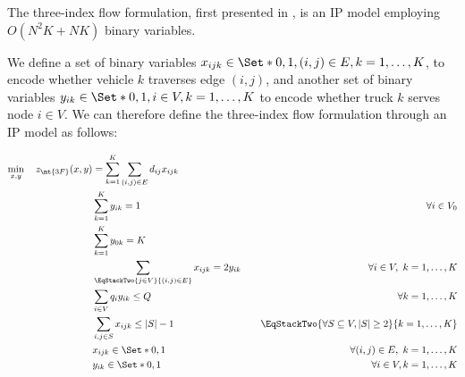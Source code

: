 The three-index flow formulation, first presented in \textcite{toth2002},
is an IP model employing $O(N^2 K + N K)$ binary variables.

We define a set of binary variables $x_{ijk} \in \Set*{0, 1}, (i, j) \in E, k = 1, \dots, K$, to encode whether vehicle $k$ traverses edge $(i, j)$,
and another set of binary variables $y_{ik} \in \Set*{0, 1}, i \in V, k = 1, \dots, K$ to encode whether truck $k$ serves node $i \in V$.
We can therefore define the three-index flow formulation through an IP model as follows:

\begin{align}
	\min_{x, y} \quad z_\mt{3F}(x, y) & =  \sum_{k = 1}^K \sum_{(i, j) \in E} d_{ij} x_{ijk} \label{eq:three-index-flow-obj-func}                                                                                                                          \\
	                                  & \sum_{k = 1}^K y_{ik} = 1                                                                 & \quad \forall i \in V_0                                              \label{eq:three-index-flow-all-customers-visited} \\
	                                  & \sum_{k = 1}^K y_{0k} = K                                                                 & \label{eq:three-index-flow-tour-starts-and-ends-at-depot}                                                              \\
	                                  & \sum_{\EqStackTwo{j \in V}{(i, j) \in E}} x_{ijk} = 2 y_{ik}                              & \quad \forall i \in V,\ k = 1, \dots, K \label{eq:three-index-flow-force-visited-customer-if-flow}                     \\
	                                  & \sum_{i \in V} q_i y_{ik} \le Q                                                           & \quad \forall k = 1, \dots, K \label{eq:three-index-flow-force-resource-upper-bound}                                   \\
	                                  & \sum_{i, j \in S} x_{ijk} \le |S| - 1                                                     & \quad \EqStackTwo{\forall S \subseteq V, |S| \ge 2}{k = 1, \dots, K} \label{eq:three-index-flow-secs}                  \\
	                                  & x_{ijk}                   \in \Set*{0, 1}                                                 & \quad \forall (i, j) \in E,\ k = 1, \dots, K             \label{eq:three-index-flow-x-mip-var-bounds}                  \\
	                                  & y_{ik}                    \in \Set*{0, 1}                                                 & \quad \forall i \in V,k = 1, \dots, K  \label{eq:three-index-flow-y-mip-var-bounds}
\end{align}

